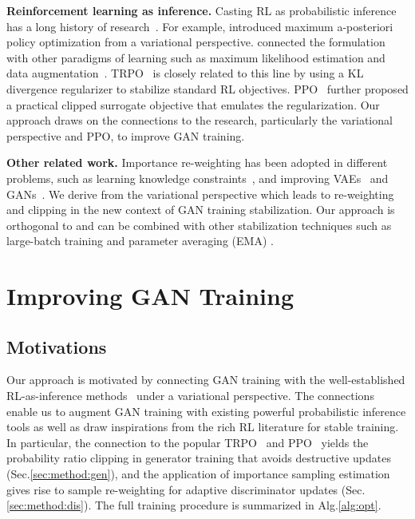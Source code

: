 \documentclass{article}
\newcommand{\0}{\bm{0}}
\begin{document}
\textbf{Reinforcement learning as inference.} 
Casting RL as probabilistic inference has a long history of research~\cite{dayan1997using,deisenroth2013survey,rawlik2013stochastic,levine2018reinforcement,abdolmaleki2018maximum}. 
For example, \citet{abdolmaleki2018maximum} introduced maximum a-posteriori policy optimization from a variational perspective. \citet{tan2018connecting} connected the formulation with other paradigms of learning such as maximum likelihood estimation and data augmentation~\citep{hu2019learning}. 
TRPO~\cite{TRPO} is closely related to this line by using a KL divergence regularizer to stabilize standard RL objectives. PPO~\cite{PPO} further proposed a practical clipped surrogate objective that emulates the regularization. Our approach draws on the connections to the research, particularly the variational perspective and PPO, to improve GAN training.






\textbf{Other related work.} 
Importance re-weighting has been adopted in different problems, such as learning knowledge constraints~\cite{hu2018deep}, and improving VAEs~\cite{burda2015importance} and GANs~\citep{hu2017unifying,song2019bridging}. 
We derive from the variational perspective which leads to re-weighting and clipping in the new context of GAN training stabilization. Our approach is orthogonal to and can be combined with other stabilization techniques such as large-batch training \citep{brock2018large} and parameter averaging (EMA) \citep{yaz2018unusual,brock2018large}. 










\section{Improving GAN Training}
\subsection{Motivations}
Our approach is motivated by connecting GAN training with the well-established RL-as-inference methods~\cite{abdolmaleki2018maximum,levine2018reinforcement,tan2018connecting} under a variational perspective. 
The connections enable us to augment GAN training with existing powerful probabilistic inference tools as well as draw inspirations from the rich RL literature for stable training. In particular, the connection to the popular TRPO~\cite{TRPO} and PPO~\cite{PPO} yields the probability ratio clipping in generator training that avoids destructive updates  (Sec.\ref{sec:method:gen}), and the application of importance sampling estimation gives rise to sample re-weighting for adaptive discriminator updates (Sec.\ref{sec:method:dis}). The full training procedure is summarized in Alg.\ref{alg:opt}.
\end{document}
